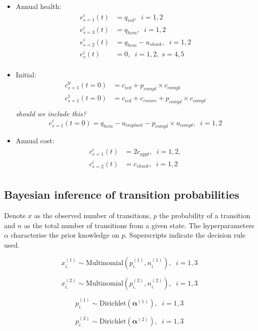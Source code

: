 \documentclass[
]{article}
\begin{document}
\begin{itemize}
\item
  Annual health: \begin{align*} 
  e^i_{s=1}(t) &= q_{icd}, \;\; i = 1,2\\
  e^i_{s=3}(t) &= q_{hcm}, \;\; i = 1,2\\
  e^i_{s=2}(t) &= q_{hcm} - u_{shock}, \;\; i = 1,2\\
  e^i_{s}(t) &= 0, \;\;  i = 1,2, \; s = 4,5\\
  \end{align*}
\item
  Initial: \begin{align*}
  c^0_{s=1}(t = 0) &= c_{icd} + p_{compl} \times c_{compl}\\
  c^1_{s=1}(t = 0) &= c_{icd} + c_{rscore} + p_{compl} \times c_{compl}\\
  \end{align*} \emph{should we include this?} \[
  e^i_{s=1}(t = 0) = q_{hcm} - u_{implant} - p_{compl} \times u_{compl}, \;\; i = 1,2
  \]
\item
  Annual cost: \begin{align*}
  c^i_{s=1}(t) &= 2 c_{appt}, \;\;  i = 1,2,\\
  c^i_{s=2}(t) &= c_{shock},  \;\; i = 1,2\\
  \end{align*}
\end{itemize}

\hypertarget{bayesian-inference-of-transition-probabilities}{%
\subsection{Bayesian inference of transition
probabilities}\label{bayesian-inference-of-transition-probabilities}}

Denote \(x\) as the observed number of transitions, \(p\) the
probability of a transition and \(n\) as the total number of transitions
from a given state. The hyperparameters \(\alpha\) characterise the
prior knowledge on \(p\). Superscripts indicate the decision rule used.

\[x^{(1)}_{i.} \sim \mbox{Multinomial}(p^{(1)}_{i.}, n^{(1)}_i), \;\; i = 1,3\]

\[x^{(2)}_{i.} \sim \mbox{Multinomial}(p^{(2)}_{i.}, n^{(2)}_i), \;\; i = 1,3\]

\[p^{(1)}_{i.} \sim \mbox{Dirichlet}(\boldsymbol{\alpha}^{(1)} ), \;\; i = 1,3\]

\[p^{(2)}_{i.} \sim \mbox{Dirichlet}(\boldsymbol{\alpha}^{(2)} ), \;\; i = 1,3\]
\end{document}
